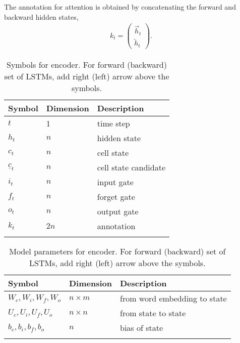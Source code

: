 \documentclass{article}
\begin{document}
	The annotation for attention is obtained by concatenating the forward and backward hidden states,
		\begin{align}
			k_t = \left(\begin{array}{cc}
				\overrightarrow{h}_t \\
				\overleftarrow{h}_t
			\end{array}\right).
		\end{align}


\begin{table}[!htb]
\centering
\begin{tabular}{lll}
\toprule
Symbol & Dimension & Description \\
\midrule
$t$ & 1 & time step \\
$h_t$ & $n$ & hidden state \\
$c_t$ & $n$ & cell state \\
$\underline{c}_t$ & $n$ & cell state candidate \\
$i_t$ & $n$ & input gate \\
$f_t$ & $n$ & forget gate \\
$o_t$ & $n$ & output gate \\
$k_t$ & $2 n$ & annotation \\
\bottomrule \\
\end{tabular}
\caption{Symbols for encoder. For forward (backward) set of LSTMs, add right (left) arrow above the symbols.}
\label{tab:EncoderSymbol}
\end{table}


\begin{table}[!htb]
\centering
\begin{tabular}{lll}
\toprule
Symbol & Dimension & Description \\
\midrule
$W_c, W_i, W_f, W_o$ & $n \times m$ & from word embedding to state \\
$U_c, U_i, U_f, U_o$ & $n \times n$ & from state to state \\
$b_c, b_i, b_f, b_o$ & $n$ & bias of state \\
\bottomrule \\
\end{tabular}
\caption{Model parameters for encoder. For forward (backward) set of LSTMs, add right (left) arrow above the symbols.}
\label{tab:EncoderModel}
\end{table}



\end{document}
